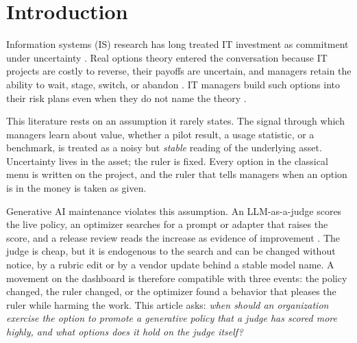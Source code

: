 \documentclass[acmsmall,screen,review]{acmart}
\theoremstyle{acmdefinition}
\begin{document}
\section{Introduction}

Information systems (IS) research has long treated IT investment as commitment under uncertainty \citep{benaroch2002,fichman2004,taudes2000}. Real options theory entered the conversation because IT projects are costly to reverse, their payoffs are uncertain, and managers retain the ability to wait, stage, switch, or abandon \citep{dixit1994,myers1977,trigeorgis1996}. IT managers build such options into their risk plans even when they do not name the theory \citep{benaroch2006}.

This literature rests on an assumption it rarely states. The signal through which managers learn about value, whether a pilot result, a usage statistic, or a benchmark, is treated as a noisy but \emph{stable} reading of the underlying asset. Uncertainty lives in the asset; the ruler is fixed. Every option in the classical menu is written on the project, and the ruler that tells managers when an option is in the money is taken as given.

Generative AI maintenance violates this assumption. An LLM-as-a-judge scores the live policy, an optimizer searches for a prompt or adapter that raises the score, and a release review reads the increase as evidence of improvement \citep{zheng2023}. The judge is cheap, but it is endogenous to the search and can be changed without notice, by a rubric edit or by a vendor update behind a stable model name. A movement on the dashboard is therefore compatible with three events: the policy changed, the ruler changed, or the optimizer found a behavior that pleases the ruler while harming the work. This article asks: \emph{when should an organization exercise the option to promote a generative policy that a judge has scored more highly, and what options does it hold on the judge itself?}
\end{document}
